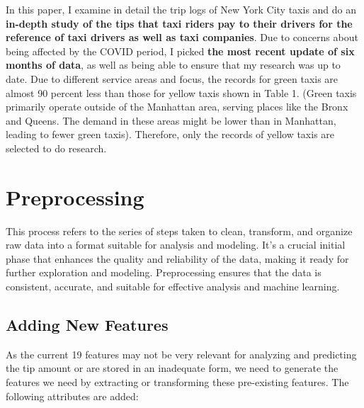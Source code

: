\documentclass[11pt]{article}
\begin{document}
In this paper, I examine in detail the trip logs of New York City taxis and do an \textbf{in-depth study of the tips that taxi riders pay to their drivers for the reference of taxi drivers as well as taxi companies}. Due to concerns about being affected by the COVID period, I picked \textbf{the most recent update of six months of data}, as well as being able to ensure that my research was up to date.  Due to different service areas and focus, the records for green taxis are almost 90 percent less than those for yellow taxis shown in Table 1. (Green taxis primarily operate outside of the Manhattan area, serving places like the Bronx and Queens. The demand in these areas might be lower than in Manhattan, leading to fewer green taxis). Therefore, only the records of yellow taxis are selected to do research.\cite{tlc}

\section{Preprocessing}
This process refers to the series of steps taken to clean, transform, and organize raw data into a format suitable for analysis and modeling. It's a crucial initial phase that enhances the quality and reliability of the data, making it ready for further exploration and modeling. Preprocessing ensures that the data is consistent, accurate, and suitable for effective analysis and machine learning.

\subsection{Adding New Features}
As the current 19 features may not be very relevant for analyzing and predicting the tip amount or are stored in an inadequate form, we need to generate the features we need by extracting or transforming these pre-existing features. The following attributes are added:
\end{document}
